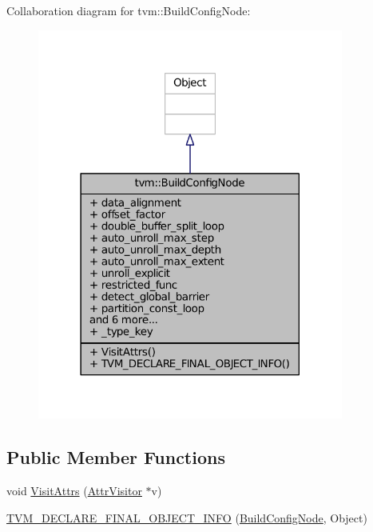 Collaboration diagram for tvm\+:\+:Build\+Config\+Node\+:
\nopagebreak
\begin{figure}[H]
\begin{center}
\leavevmode
\includegraphics[width=285pt]{classtvm_1_1BuildConfigNode__coll__graph}
\end{center}
\end{figure}
\subsection*{Public Member Functions}
\begin{DoxyCompactItemize}
\item 
void \hyperlink{classtvm_1_1BuildConfigNode_a5514cee791fd035addad8caf89b73bde}{Visit\+Attrs} (\hyperlink{classtvm_1_1AttrVisitor}{Attr\+Visitor} $\ast$v)
\item 
\hyperlink{classtvm_1_1BuildConfigNode_a03301ebe2141ae95117e8f15e411f199}{T\+V\+M\+\_\+\+D\+E\+C\+L\+A\+R\+E\+\_\+\+F\+I\+N\+A\+L\+\_\+\+O\+B\+J\+E\+C\+T\+\_\+\+I\+N\+FO} (\hyperlink{classtvm_1_1BuildConfigNode}{Build\+Config\+Node}, Object)
\end{DoxyCompactItemize}
